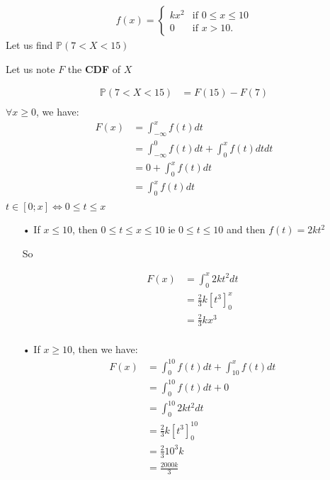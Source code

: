 \documentclass[11pt]{article}
\def\gt{>}
\def\lt{<}
\begin{document}
\begin{align*}
f(x) = \begin{cases}
            kx^2 & \text{if } 0 \leq x \leq 10 \\
            0 & \text{if } x \gt 10.
        \end{cases}
\end{align*}
Let us find $\mathbb{P}(7 \lt X \lt 15)$

Let us note $F$ the \textbf{CDF} of $X$

\begin{align*}
\mathbb{P}(7 \lt X \lt 15) &= F(15)-F(7) \\
\end{align*}
$\forall x\ge 0 $, we have:
\begin{align*}
F(x) &=\int_\mathbb{-\infty}^x f(t)dt\\
&=\int_{-\infty}^{0} f(t)dt+ \int_0^{x} f(t)dtdt\\
				  &=0+ \int_0^{x} f(t)dt\\
				  &=\int_0^{x} f(t)dt\\
\end{align*}
$t \in \left[0 ; x\right] \iff 0 \le t \le x$

\begin{itemize}
\item[•] If $x \le 10$, then $0 \le t \le x \le 10$ ie $0 \le t \le 10$ and then $f(t)=2kt^2$

So 

\begin{align*}
F(x) &=\int_{0}^x 2kt^2dt\\
&=\frac{2}{3}k\left[t^3\right]_0^x \\
&=\frac{2}{3}kx^3 \\
\end{align*}
\item[•] If $x \ge 10$, then we have:
\begin{align*}
F(x) &=\int_{0}^{10} f(t)dt+\int_{10}^x f(t)dt\\
&=\int_{0}^{10} f(t)dt+0\\
&=\int_{0}^{10} 2kt^2dt \\
&=\frac{2}{3}k\left[t^3\right]_0^{10} \\
&=\frac{2}{3} 10^3 k \\
&=\frac{2000k}{3}
\end{align*}

\end{itemize}
\end{document}
